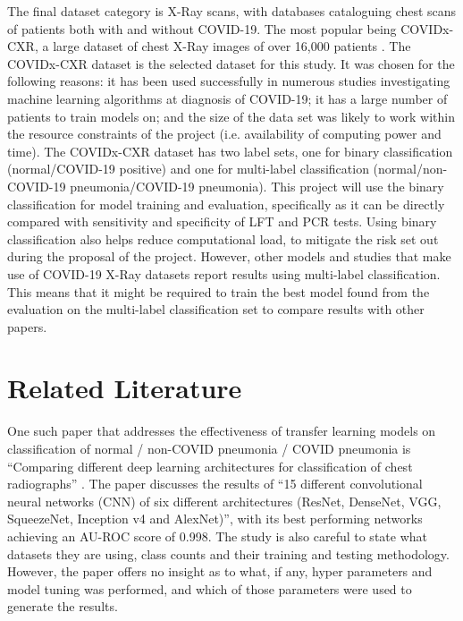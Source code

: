 The final dataset category is X-Ray scans, with databases cataloguing chest scans of patients both with and without COVID-19. The most popular being COVIDx-CXR, a large dataset of chest X-Ray images of over 16,000 patients \citep{wang2020covid}. The COVIDx-CXR dataset is the selected dataset for this study. It was chosen for the following reasons: it has been used successfully in numerous studies investigating machine learning algorithms at diagnosis of COVID-19; it has a large number of patients to train models on; and the size of the data set was likely to work within the resource constraints of the project (i.e. availability of computing power and time). The COVIDx-CXR dataset has two label sets, one for binary classification (normal/COVID-19 positive) and one for multi-label classification (normal/non-COVID-19 pneumonia/COVID-19 pneumonia). This project will use the binary classification for model training and evaluation, specifically as it can be directly compared with sensitivity and specificity of LFT and PCR tests. Using binary classification also helps reduce computational load, to mitigate the risk set out during the proposal of the project. However, other models and studies that make use of COVID-19 X-Ray datasets report results using multi-label classification. This means that it might be required to train the best model found from the evaluation on the multi-label classification set to compare results with other papers.

\section{Related Literature}
One such paper that addresses the effectiveness of transfer learning models on classification of normal / non-COVID pneumonia / COVID pneumonia is “Comparing different deep learning architectures for classification of chest radiographs” \citep{bressem2020comparing}. The paper discusses the results of “15 different convolutional neural networks (CNN) of six different architectures (ResNet, DenseNet, VGG, SqueezeNet, Inception v4 and AlexNet)”, with its best performing networks achieving an AU-ROC score of 0.998. The study is also careful to state what datasets they are using, class counts and their training and testing methodology. However, the paper offers no insight as to what, if any, hyper parameters and model tuning was performed, and which of those parameters were used to generate the results. 

